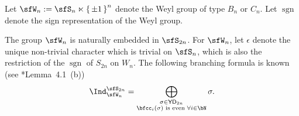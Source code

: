 \documentclass[12pt,a4paper]{amsart}
\newcommand{\sgn}{\operatorname{sgn}}
\def\DDD{{\check\nabla}}
\numberwithin{equation}{section}
\theoremstyle{remark}
\def\Irr{\mathrm{Irr}}
\def\ckGc{\check{G}_{\bC}}
\def\YD{\mathsf{YD}}
\def\lamck{\lambda_\ckcO}
\def\cuprow{{\stackrel{r}{\sqcup}}}
\def\cuprow{{\,\stackrel{r}{\sqcup}\,}}
\begin{document}








Let $\sfW_n := \sfS_n \ltimes \set{\pm 1}^n$ denote the Weyl group of type $B_n$
or $C_n$. Let $\sgn$ denote the sign representation of the Weyl group.

The group $\sfW_n$ is naturally embedded in $\sfS_{2n}$. For $\sfW_n$, let
$\epsilon$ denote the unique non-trivial character which is trivial on $\sfS_n$,
which is also the restriction of the $\sgn$ of $S_{2n}$ on $W_n$. The following
branching formula is known (see \cite{BV.W}*{Lemma~4.1~(b)})
\begin{equation}
  \Ind_{\sfW_{n}}^{\sfS_{2n}} = \bigoplus_{\substack{\sigma\in \YD_{2n}\\
      \bfcc_{i}(\sigma) \text{ is even } \forall i\in \bN}} \sigma.
\end{equation}
\end{document}

